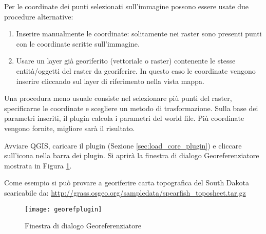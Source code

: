 
Per le coordinate dei punti selezionati sull'immagine possono essere usate due procedure alternative:

\begin{enumerate}
\item Inserire manualmente le coordinate: solitamente nei raster sono presenti 
punti con le coordinate scritte sull'immagine.
\item Usare un layer già georiferito (vettoriale o raster) contenente le stesse entità/oggetti 
del raster da georiferire. In questo caso le coordinate vengono inserire cliccando sul layer 
di riferimento nella vista mappa.
\end{enumerate}

Una procedura meno usuale consiste nel selezionare più punti del raster, specificarne le coordinate 
e scegliere un metodo di trasformazione. Sulla base dei parametri inseriti, il plugin 
calcola i parametri del world file. Più coordinate vengono fornite, migliore sarà il 
risultato.

Avviare QGIS, caricare il plugin (Sezione \ref{sec:load_core_plugin}) e cliccare 
sull'icona  nella barra dei plugin. 
Si aprirà la finestra di dialogo Georeferenziatore mostrata in Figura \ref{fig:georefplugin}.
  
Come esempio si può provare a georiferire carta topografica del South Dakota scaricabile da:
\url{http://grass.osgeo.org/sampledata/spearfish\_toposheet.tar.gz}

\begin{figure}[ht]
\centering
  \texttt{[image: georefplugin]}
  \caption{Finestra di dialogo Georeferenziatore \nixcaption}\label{fig:georefplugin}
\end{figure}

\label{georeferencer_entering}

